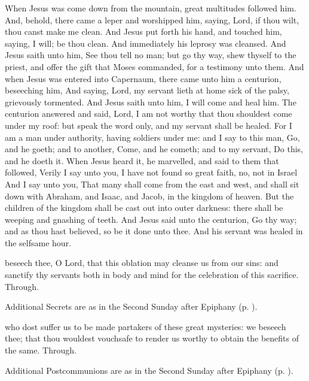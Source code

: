  When Jesus was come down from the mountain, great multitudes followed him. And, behold, there came a leper and worshipped him, saying, Lord, if thou wilt, thou canst make me clean. And Jesus put forth his hand, and touched him, saying, I will; be thou clean. And immediately his leprosy was cleansed. And Jesus saith unto him, See thou tell no man; but go thy way, shew thyself to the priest, and offer the gift that Moses commanded, for a testimony unto them. And when Jesus was entered into Capernaum, there came unto him a centurion, beseeching him, And saying, Lord, my servant lieth at home sick of the palsy, grievously tormented. And Jesus saith unto him, I will come and heal him. The centurion answered and said, Lord, I am not worthy that thou shouldest come under my roof: but speak the word only, and my servant shall be healed. For I am a man under authority, having soldiers under me: and I say to this man, Go, and he goeth; and to another, Come, and he cometh; and to my servant, Do this, and he doeth it. When Jesus heard it, he marvelled, and said to them that followed, Verily I say unto you, I have not found so great faith, no, not in Israel And I say unto you, That many shall come from the east and west, and shall sit down with Abraham, and Isaac, and Jacob, in the kingdom of heaven. But the children of the kingdom shall be cast out into outer darkness: there shall be weeping and gnashing of teeth. And Jesus said unto the centurion, Go thy way; and as thou hast believed, so be it done unto thee. And his servant was healed in the selfsame hour.

\secret
{} beseech thee, O Lord, that this oblation may cleanse us from our sins: and sanctify thy servants both in body and mind for the celebration of this sacrifice. Through.
\begin{rubric}
    Additional Secrets are as in the Second Sunday after Epiphany (p. \pageref{EpiphanyII}).
\end{rubric}
\postcommunion
{} who dost suffer us to be made partakers of these great mysteries: we beseech thee; that thou wouldest vouchsafe to render us worthy to obtain the benefits of the same. Through.
\begin{rubric}
    Additional Postcommunions are as in the Second Sunday after Epiphany (p. \pageref{EpiphanyII}).
\end{rubric}


